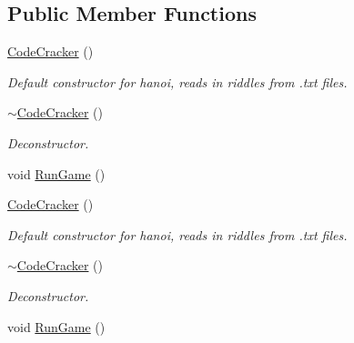 \subsection*{Public Member Functions}
\begin{DoxyCompactItemize}
\item 
\hypertarget{classCodeCracker_a46b5ec438efd38104b9a406b45c8cd68}{\hyperlink{classCodeCracker_a46b5ec438efd38104b9a406b45c8cd68}{Code\-Cracker} ()}\label{classCodeCracker_a46b5ec438efd38104b9a406b45c8cd68}

\begin{DoxyCompactList}\small\item\em Default constructor for hanoi, reads in riddles from .txt files. \end{DoxyCompactList}\item 
\hypertarget{classCodeCracker_ae7dc389e166286ca2271625154dde39c}{\hyperlink{classCodeCracker_ae7dc389e166286ca2271625154dde39c}{$\sim$\-Code\-Cracker} ()}\label{classCodeCracker_ae7dc389e166286ca2271625154dde39c}

\begin{DoxyCompactList}\small\item\em Deconstructor. \end{DoxyCompactList}\item 
void \hyperlink{classCodeCracker_a4f2aaaf60b31cf33cc0d70622665be45}{Run\-Game} ()
\item 
\hypertarget{classCodeCracker_a46b5ec438efd38104b9a406b45c8cd68}{\hyperlink{classCodeCracker_a46b5ec438efd38104b9a406b45c8cd68}{Code\-Cracker} ()}\label{classCodeCracker_a46b5ec438efd38104b9a406b45c8cd68}

\begin{DoxyCompactList}\small\item\em Default constructor for hanoi, reads in riddles from .txt files. \end{DoxyCompactList}\item 
\hypertarget{classCodeCracker_ae7dc389e166286ca2271625154dde39c}{\hyperlink{classCodeCracker_ae7dc389e166286ca2271625154dde39c}{$\sim$\-Code\-Cracker} ()}\label{classCodeCracker_ae7dc389e166286ca2271625154dde39c}

\begin{DoxyCompactList}\small\item\em Deconstructor. \end{DoxyCompactList}\item 
void \hyperlink{classCodeCracker_a4f2aaaf60b31cf33cc0d70622665be45}{Run\-Game} ()
\end{DoxyCompactItemize}


